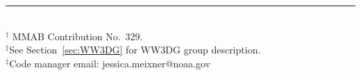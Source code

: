 \vfill

\noindent \rule{140mm}{0.5mm} \\
{\small $^\dag$ MMAB Contribution No.~329. \\
$^\ddag$See Section~\ref{sec:WW3DG} for WW3DG group description.\\
$^\ddag$Code manager email: jessica.meixner@noaa.gov}

\bpage

\pb

\pagestyle{myheadings}
\setcounter{page}{1}
\tableofcontents

\pb
\pagestyle{empty}
\bpagea

\pb
\pagestyle{myheadings}



